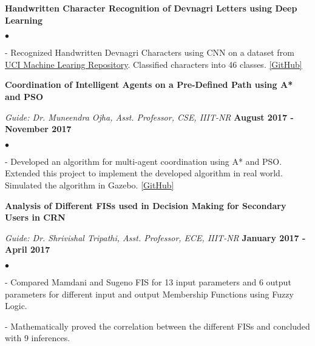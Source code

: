 \documentclass[margin,line]{res}
\newenvironment{list2}{
  \begin{list}{$\bullet$}{%
      \setlength{\itemsep}{0in}
      \setlength{\parsep}{0in} \setlength{\parskip}{0in}
      \setlength{\topsep}{0in} \setlength{\partopsep}{0in} 
      \setlength{\leftmargin}{0.2in}}}{\end{list}}
\begin{document}
\begin{resume}
\vspace{-.1in}
{\bf Handwritten Character Recognition of Devnagri Letters using Deep Learning}
\begin{list2}
\item[-] Recognized Handwritten Devnagri Characters using CNN on a dataset from \textcolor{blue}{\href{https://archive.ics.uci.edu/ml/datasets/Devanagari+Handwritten+Character+Dataset}{UCI Machine Learing Repository}}. Classified characters into 46 classes. \textcolor{blue}{\href{https://github.com/panditu2015/DL-Character-Recogntion}{[GitHub]}}
\end{list2}

\vspace{-.1in}
{\bf Coordination of Intelligent Agents on a Pre-Defined Path using A* and PSO}

\vspace{-.3cm}
{\em Guide: Dr. Muneendra Ojha, Asst. Professor, CSE, IIIT-NR} \hfill {\bf August 2017 - November 2017}\\
\vspace*{-.4cm}
\begin{list2}
\item[-] Developed an algorithm for multi-agent coordination using A* and PSO. Extended this project to implement the developed algorithm in real world. Simulated the algorithm in Gazebo. \textcolor{blue}{\href{https://github.com/panditu2015/Intelligent-Agents-Coordination}{[GitHub]}}
\end{list2}


\vspace{-.1in}
{\bf Analysis of Different FISs used in Decision Making for Secondary Users in CRN}

\vspace{-.3cm}
{\em Guide: Dr. Shrivishal Tripathi, Asst. Professor, ECE, IIIT-NR} \hfill {\bf January 2017 - April 2017}\\
\vspace*{-.4cm}
\begin{list2}
\item[-] Compared Mamdani and Sugeno FIS for 13 input parameters and 6 output parameters for different input and
output Membership Functions using Fuzzy Logic. 
\item[-] Mathematically proved the correlation between the
different FISs and concluded with 9 inferences.
\end{list2}

\vspace{-.2cm}

\end{resume}
\end{document}
